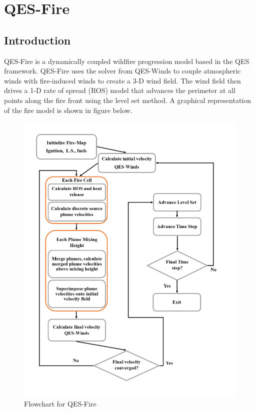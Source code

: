 \chapter{QES-Fire}

\section{Introduction}

QES-Fire \cite{Moody2022,Moody2023} is a dynamically coupled wildfire progression model based in the QES framework. QES-Fire uses the solver from QES-Winds to couple atmospheric winds with fire-induced winds to create a 3-D wind field. The wind field then drives a 1-D rate of spread (ROS) model that advances the perimeter at all points along the fire front using the level set method. A graphical representation of the fire model is shown in figure below.   


\begin{figure}[H]
\includegraphics[width=14cm]{Images/Fire-Flowchart.png}
\caption{Flowchart for QES-Fire}
\end{figure}


